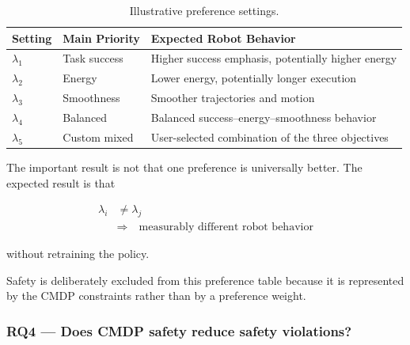 \documentclass[journal]{IEEEtran}
\begin{document}
\begin{table}[t]
\centering
\caption{Illustrative preference settings.}
\label{tab:preference_settings}
\renewcommand{\arraystretch}{1.2}

\footnotesize

\begin{tabular}{l l l}
\toprule
\textbf{Setting}
&
\textbf{Main Priority}
&
\textbf{Expected Robot Behavior}
\\
\midrule

$\lambda_1$
&
Task success
&
Higher success emphasis, potentially higher energy
\\

$\lambda_2$
&
Energy
&
Lower energy, potentially longer execution
\\

$\lambda_3$
&
Smoothness
&
Smoother trajectories and motion
\\

$\lambda_4$
&
Balanced
&
Balanced success--energy--smoothness behavior
\\

$\lambda_5$
&
Custom mixed
&
User-selected combination of the three objectives
\\

\bottomrule
\end{tabular}
\end{table}

The important result is not that one preference is universally better.
The expected result is that

\begin{equation}
\boxed{
\begin{aligned}
\lambda_i &\neq \lambda_j\\
&\Rightarrow\quad \text{measurably different robot behavior}
\end{aligned}
}
\end{equation}

without retraining the policy.

Safety is deliberately excluded from this preference table because it
is represented by the CMDP constraints rather than by a preference
weight.


\subsubsection{RQ4 --- Does CMDP safety reduce safety violations?}
\end{document}
